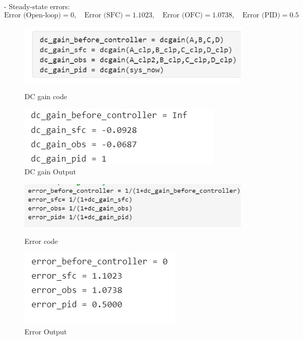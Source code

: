 \documentclass[a4paper,12pt]{article}
\begin{document}
- Steady-state errors:
\[
\text{Error (Open-loop)} = 0, \quad
\text{Error (SFC)} = 1.1023, \quad
\text{Error (OFC)} = 1.0738, \quad
\text{Error (PID)} = 0.5
\]
\begin{figure}[h!]
    \centering
    \begin{minipage}{0.5\textwidth}
        \centering
        \includegraphics[width=\textwidth]{dcgain.png}
        \caption{DC gain code}
       
    \end{minipage}
    \hfill
    \begin{minipage}{0.45\textwidth}
        \centering
        \includegraphics[width=\textwidth]{dcgain_output.png}
        \caption{DC gain Output}
    
    \end{minipage}

\end{figure}
\begin{figure}[H]
    \centering
    \begin{minipage}{0.45\textwidth}
        \centering
        \includegraphics[width=\textwidth]{error.png}
        \caption{Error code}
     
    \end{minipage}
    \hfill
    \begin{minipage}{0.45\textwidth}
        \centering
        \includegraphics[width=\textwidth]{error_output.png}
        \caption{Error Output}
    \end{minipage}
\end{figure}
\end{document}
